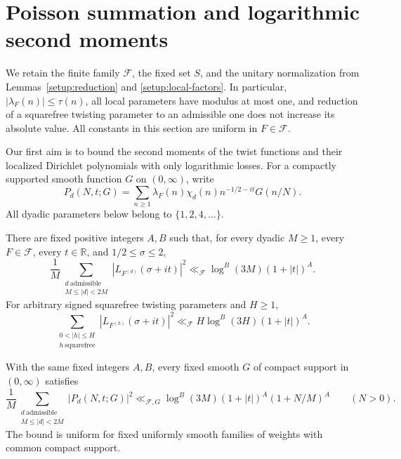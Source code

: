 \section{Poisson summation and logarithmic second moments}
\label{analytic:section}
\label{sec:analytic}

We retain the finite family $\mathcal F$, the fixed set $S$, and the
unitary normalization from Lemmas~\ref{setup:reduction} and
\ref{setup:local-factors}. In particular, $|\lambda_F(n)|\leq\tau(n)$,
all local parameters have modulus at most one, and reduction of a
squarefree twisting parameter to an admissible one does not increase its
absolute value. All constants in this section are uniform in
$F\in\mathcal F$.

Our first aim is to bound the second moments of the twist functions and
their localized Dirichlet polynomials with only logarithmic losses.
For a compactly supported smooth function $G$ on $(0,\infty)$, write
\[
 P_d(N,t;G)=\sum_{n\geq1}
 \lambda_F(n)\chi_d(n)n^{-1/2-it}G(n/N).
\]
All dyadic parameters below belong to $\{1,2,4,\ldots\}$.

\begin{proposition}\label{analytic:moment}
There are fixed positive integers $A,B$ such that, for every dyadic
$M\geq1$, every $F\in\mathcal F$, every $t\in\mathbb R$, and
$1/2\leq\sigma\leq2$,
\begin{equation}\label{analytic:L-moment}
 \frac1M\sum_{\substack{d\ \mathrm{admissible}\\M\leq|d|<2M}}
 |L_{F^{(d)}}(\sigma+it)|^2
 \ll_{\mathcal F}\log^B(3M)(1+|t|)^A.
\end{equation}
For arbitrary signed squarefree twisting parameters and $H\geq1$,
\begin{equation}\label{analytic:prefix-moment}
 \sum_{\substack{0<|h|\leq H\\h\ \mathrm{squarefree}}}
 |L_{F^{(h)}}(\sigma+it)|^2
 \ll_{\mathcal F}H\log^B(3H)(1+|t|)^A.
\end{equation}
\end{proposition}

\begin{proposition}
\label{analytic:polynomial-moment}
With the same fixed integers $A,B$, every fixed smooth $G$ of compact
support in $(0,\infty)$ satisfies
\begin{equation}\label{analytic:polynomial-bound}
 \frac1M\sum_{\substack{d\ \mathrm{admissible}\\M\leq|d|<2M}}
 |P_d(N,t;G)|^2
 \ll_{\mathcal F,G}
 \log^B(3M)(1+|t|)^A(1+N/M)^A
 \qquad(N>0).
\end{equation}
The bound is uniform for fixed uniformly smooth families of weights
with common compact support.
\end{proposition}

